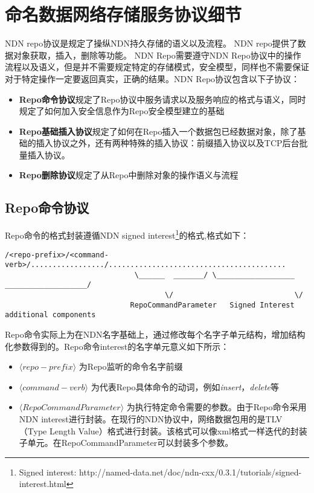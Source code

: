 \section{命名数据网络存储服务协议细节}
NDN repo协议是规定了操纵NDN持久存储的语义以及流程。 NDN repo提供了数据对象获取，插入，删除等功能。 NDN Repo需要遵守NDN Repo协议中的操作流程以及语义，但是并不需要规定特定的存储模式，安全模型，同样也不需要保证对于特定操作一定要返回真实，正确的结果。NDN Repo协议包含以下子协议：

\begin{itemize}
\item \textbf{Repo命令协议}规定了Repo协议中服务请求以及服务响应的格式与语义，同时规定了如何加入安全信息作为Repo安全模型建立的基础
\item \textbf{Repo基础插入协议}规定了如何在Repo插入一个数据包已经数据对象，除了基础的插入协议之外，还有两种特殊的插入协议：前缀插入协议以及TCP后台批量插入协议。
\item \textbf{Repo删除协议}规定了从Repo中删除对象的操作语义与流程
\end{itemize}

\subsection{Repo命令协议}
Repo命令的格式封装遵循NDN signed interest\footnote{Signed interest: http://named-data.net/doc/ndn-cxx/0.3.1/tutorials/signed-interest.html}的格式,格式如下：

\begin{framed}
\begin{scriptsize}
\begin{verbatim}
/<repo-prefix>/<command-verb>/................./.........................................
                              \______  _______/ \__________________  ___________________/
                                     \/                            \/
                             RepoCommandParameter   Signed Interest additional components
\end{verbatim}
\end{scriptsize}
\end{framed}

Repo命令实际上为在NDN名字基础上，通过修改每个名字子单元结构，增加结构化参数得到的。Repo命令interest的名字单元意义如下所示：


\begin{itemize}
\item $\langle repo-prefix\rangle$ 为Repo监听的命令名字前缀
\item $\langle command-verb\rangle$ 为代表Repo具体命令的动词，例如\textit{insert}，\textit{delete}等
\item $\langle RepoCommandParameter\rangle$ 为执行特定命令需要的参数。由于Repo命令采用NDN interest进行封装。在现行的NDN协议中，网络数据包用的是TLV（Type Length Value）格式进行封装。该格式可以像xml格式一样迭代的封装子单元。在RepoCommandParameter可以封装多个参数。
\end{itemize}

